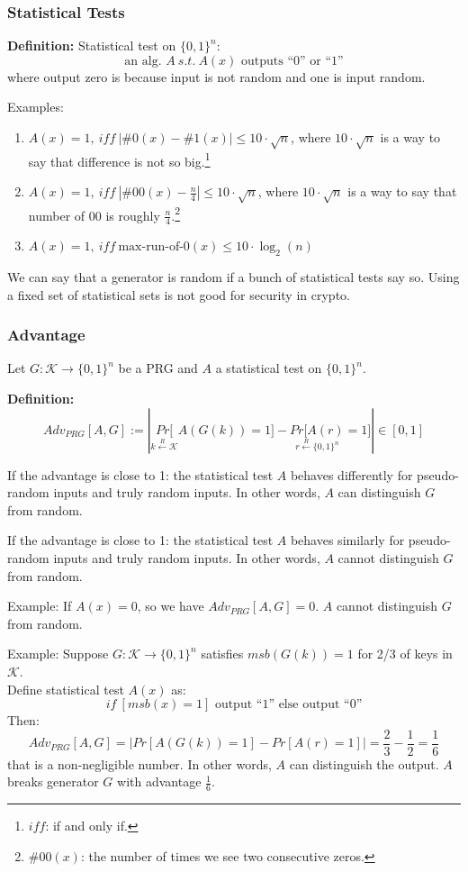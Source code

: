 \documentclass[12pt]{book}
\newcommand{\Def}{\textcolor{dkgreen}{\textbf{Definition:}} }
\begin{document}
\subsubsection{Statistical Tests}
\Def Statistical test on $\{0,1\}^{n}$:
$$\text{an alg. }A\ s.t.\ A(x)\text{ outputs ``0'' or ``1''}$$where output zero is because input is not random and one is input random.

Examples:
\begin{enumerate}
	\item $A(x)=1,\ iff\ \left|\#0(x)-\#1(x)\right|\leq 10\cdot\sqrt{n}$, where $10\cdot \sqrt{n}$ is a way to say that difference is not so big.\footnote{$iff$: if and only if.}
	\item $A(x)=1,\ iff\ \left|\#00(x)-\frac{n}{4}\right|\leq 10\cdot\sqrt{n}$, where $10\cdot \sqrt{n}$ is a way to say that number of 00 is roughly $\frac{n}{4}$.\footnote{$\#00(x)$: the number of times we see two consecutive zeros.}
	\item $A(x)=1,\ iff\ \text{max-run-of-0}(x)\leq 10\cdot \log_{2}(n)$
\end{enumerate}
We can say that a generator is random if a bunch of statistical tests say so. Using a fixed set of statistical sets is not good for security in crypto.

\subsubsection{Advantage}
Let $G:\mathcal{K}\rightarrow\{0,1\}^{n}$ be a PRG and $A$ a statistical test on $\{0,1\}^{n}$.

\Def 
$$Adv_{PRG}[A,G]:=\left|\underset{k\xleftarrow{R}\mathcal{K}}{Pr[}A(G(k))=1]-\underset{r\xleftarrow{R}\{0,1\}^{n}}{Pr[A(r)}=1]\right|\in[0,1]$$

If the advantage is close to 1: the statistical test $A$ behaves differently for pseudo-random inputs and truly random inputs. In other words, $A$ can distinguish $G$ from random.

If the advantage is close to 1: the statistical test $A$ behaves similarly for pseudo-random inputs and truly random inputs. In other words, $A$ cannot distinguish $G$ from random.

Example: If $A(x)=0$, so we have $Adv_{PRG}[A,G]=0$. $A$ cannot distinguish $G$ from random.

Example: Suppose $G:\mathcal{K}\rightarrow\{0,1\}^{n}$ satisfies $msb(G(k))=1$ for 2/3 of keys in $\mathcal{K}$.\\
Define statistical test $A(x)$ as:
$$if\ [msb(x)=1]\text{ output ``1'' else output ``0''}$$Then:
$$Adv_{PRG}[A,G]=\left|Pr[A(G(k))=1]-Pr[A(r)=1]\right|=\frac{2}{3}-\frac{1}{2}=\frac{1}{6}$$that is a non-negligible number. In other words, $A$ can distinguish the output. $A$ breaks generator $G$ with advantage $\frac{1}{6}$.
\end{document}

